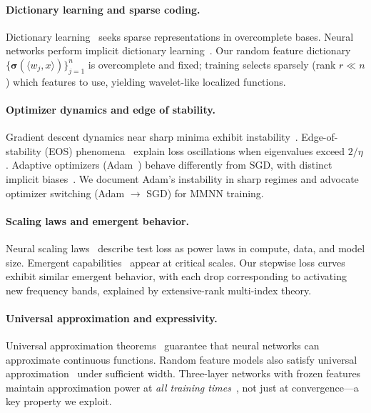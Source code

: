 \documentclass{article}
\DeclareRobustCommand{\ReLU}{\mathrel{\boldsymbol{\sigma}}}
\begin{document}
\paragraph{Dictionary learning and sparse coding.}
Dictionary learning~\cite{mairal2009online,elad2010sparse} seeks sparse representations in overcomplete bases. Neural networks perform implicit dictionary learning~\cite{papyan2017convolutional,sulam2020multi}. Our random feature dictionary \( \{\ReLU(\langle w_j, x \rangle)\}_{j=1}^n \) is overcomplete and fixed; training selects sparsely (rank \( r \ll n \)) which features to use, yielding wavelet-like localized functions.

\paragraph{Optimizer dynamics and edge of stability.}
Gradient descent dynamics near sharp minima exhibit instability~\cite{cohen2021gradient}. Edge-of-stability (EOS) phenomena~\cite{cohen2021gradient} explain loss oscillations when eigenvalues exceed \( 2/\eta \). Adaptive optimizers (Adam~\cite{kingma2014adam}) behave differently from SGD, with distinct implicit biases~\cite{wilson2017marginal}. We document Adam's instability in sharp regimes and advocate optimizer switching (Adam \( \to \) SGD) for MMNN training.

\paragraph{Scaling laws and emergent behavior.}
Neural scaling laws~\cite{kaplan2020scaling,hoffmann2022training} describe test loss as power laws in compute, data, and model size. Emergent capabilities~\cite{wei2022emergent} appear at critical scales. Our stepwise loss curves exhibit similar emergent behavior, with each drop corresponding to activating new frequency bands, explained by extensive-rank multi-index theory.

\paragraph{Universal approximation and expressivity.}
Universal approximation theorems~\cite{cybenko1989approximation,hornik1989multilayer} guarantee that neural networks can approximate continuous functions. Random feature models also satisfy universal approximation~\cite{rahimi2008weighted} under sufficient width. Three-layer networks with frozen features maintain approximation power at \emph{all training times}~\cite{nguyen2021proof}, not just at convergence—a key property we exploit.
\end{document}
